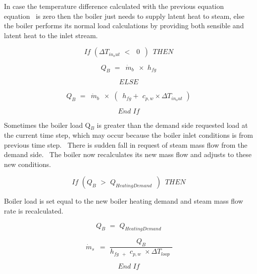 In case the temperature difference calculated with the previous equation equation~ is zero then the boiler just needs to supply latent heat to steam, else the boiler performs its normal load calculations by providing both sensible and latent heat to the inlet stream.

\begin{equation}
If\,\,(\Delta {T_{in_out}}\,\, < \,\,\,\,0\,\,\,)\,\,\,THEN
\end{equation}

\begin{equation}
{Q_B}\,\, = \,\,\,{\dot m_b}\,\,\, \times \,\,{h_{fg}}
\end{equation}

\begin{equation}
ELSE
\end{equation}

\begin{equation}
{Q_B}\,\, = \,\,\,{\dot m_b}\,\,\, \times \,\,(\,\,\,{h_{fg}} + \,\,{c_{p,w}} \times \Delta {T_{in_out}}\,\,)
\end{equation}

\begin{equation}
End\,\,If
\end{equation}

Sometimes the boiler load Q\(_{B}\) is greater than the demand side requested load at the current time step, which may occur because the boiler inlet conditions is from previous time step.~ There is sudden fall in request of steam mass flow from the demand side.~ The boiler now recalculates its new mass flow and adjusts to these new conditions.

\begin{equation}
If\,\,({Q_B}\,\, > \,\,{Q_{HeatingDemand}}\,\,\,)\,\,\,THEN
\end{equation}

Boiler load is set equal to the new boiler heating demand and steam mass flow rate is recalculated.

\begin{equation}
{Q_B}\,\, = \,\,{Q_{HeatingDemand}}
\end{equation}

\begin{equation}
\,{\dot m_s}\,\,\, = \,\,\frac{{{Q_B}}}{{{h_{fg\,\,\, + }}\,\,{c_{p,w}}\,\, \times \Delta {T_{loop}}\,\,}}
\end{equation}

\begin{equation}
End\,\,If
\end{equation}

